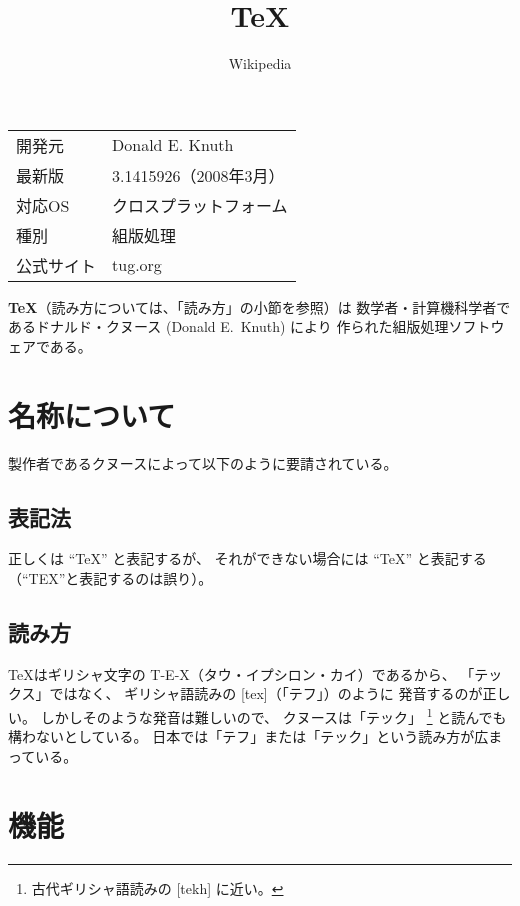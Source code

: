 \documentclass{jsarticle}
\title{\TeX}
\author{Wikipedia}
\begin{document}
\maketitle

\begin{table}[htb]
\begin{center}
\begin{tabular}{ll}
開発元 & Donald E. Knuth\\
最新版 & 3.1415926（2008年3月）\\
対応OS & クロスプラットフォーム\\
種別 & 組版処理\\
公式サイト & tug.org\\
\end{tabular}
\end{center}
\end{table}

{\bfseries \TeX}（読み方については、「読み方」の小節を参照）は
数学者・計算機科学者であるドナルド・クヌース (Donald E.~Knuth) により
作られた組版処理ソフトウェアである。

\tableofcontents

\section{名称について}

製作者であるクヌースによって以下のように要請されている。

\subsection{表記法}

正しくは ``\TeX'' と表記するが、
それができない場合には ``TeX'' と表記する（``TEX''と表記するのは誤り）。

\subsection{読み方}

\TeX はギリシャ文字の
T-E-X（タウ・イプシロン・カイ）であるから、
「テックス」ではなく、
ギリシャ語読みの [tex]（「テフ」）のように
発音するのが正しい。
しかしそのような発音は難しいので、
クヌースは「テック」%
\footnote{古代ギリシャ語読みの [tekh] に近い。}%
と読んでも構わないとしている。
日本では「テフ」または「テック」という読み方が広まっている。

\section{機能}
\end{document}
